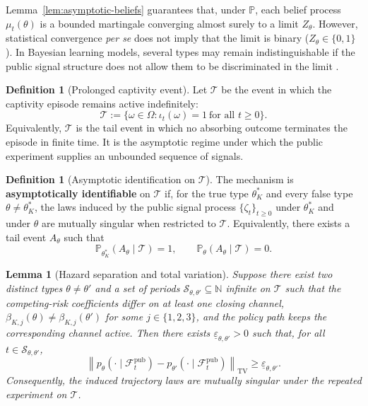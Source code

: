 \documentclass[12pt,a4paper]{article}
\providecommand{\textcite}{\citet}
\theoremstyle{plain}
\newtheorem{lemma}[theorem]{Lemma}
\theoremstyle{definition}
\newtheorem{definition}[theorem]{Definition}
\theoremstyle{remark}
\newcommand{\ProbE}{\mathbb{P}}
\newcommand{\ProbC}[1]{\mathbb{P}_{#1}}
\newcommand{\1}{\mathbf{1}}
\begin{document}
Lemma~\ref{lem:asymptotic-beliefs} guarantees that, under $\ProbE$, each belief process
$\mu_t(\theta)$ is a bounded martingale converging almost surely to a limit
$Z_\theta$. However, statistical convergence \emph{per se} does not imply that the
limit is binary ($Z_\theta\in\{0,1\}$). In Bayesian learning models, several types may
remain indistinguishable if the public signal structure does not allow them to be
discriminated in the limit \textcite{Schervish1995Theory}.

\begin{definition}[Prolonged captivity event]
\label{def:event-T-long}
Let $\mathcal{T}$ be the event in which the captivity episode remains active
indefinitely:
\[
\mathcal{T}:=\{\omega\in\Omega:\iota_t(\omega)=1\ \text{for all }t\ge0\}.
\]
Equivalently, $\mathcal{T}$ is the tail event in which no absorbing outcome terminates
the episode in finite time. It is the asymptotic regime under which the public
experiment supplies an unbounded sequence of signals.
\end{definition}

\begin{definition}[Asymptotic identification on $\mathcal{T}$]
\label{def:asymptotic-id}
The mechanism is \textbf{asymptotically identifiable} on $\mathcal{T}$ if, for the true
type $\theta_K^\ast$ and every false type $\theta\neq\theta_K^\ast$, the laws induced by
the public signal process $\{\zeta_t\}_{t\ge0}$ under $\theta_K^\ast$ and under
$\theta$ are mutually singular when restricted to $\mathcal{T}$. Equivalently, there
exists a tail event $A_\theta$ such that
\[
\ProbC{\theta_K^\ast}(A_\theta\mid\mathcal{T})=1,
\qquad
\ProbC{\theta}(A_\theta\mid\mathcal{T})=0.
\]
\end{definition}

\begin{lemma}[Hazard separation and total variation]
\label{lem:hazard-separation}
Suppose there exist two distinct types $\theta\neq\theta'$ and a set of periods
$\mathcal{S}_{\theta,\theta'}\subseteq\mathbb{N}$ infinite on $\mathcal{T}$ such that
the competing-risk coefficients differ on at least one closing channel,
$\beta_{K,j}(\theta)\neq\beta_{K,j}(\theta')$ for some $j\in\{1,2,3\}$, and the policy
path keeps the corresponding channel active. Then there exists
$\underline{\varepsilon}_{\theta,\theta'}>0$ such that, for all
$t\in\mathcal{S}_{\theta,\theta'}$,
\begin{equation}
\label{eq:TV-separation}
\left\|p_\theta(\cdot\mid\mathcal{F}_t^{\mathrm{pub}})
-p_{\theta'}(\cdot\mid\mathcal{F}_t^{\mathrm{pub}})\right\|_{\mathrm{TV}}
\ge \underline{\varepsilon}_{\theta,\theta'}.
\end{equation}
Consequently, the induced trajectory laws are mutually singular under the repeated
experiment on $\mathcal{T}$.
\end{lemma}
\end{document}
